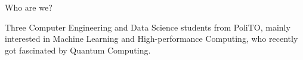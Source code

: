 \graphicspath{{assets/whoarewe/}} 

\begin{frame}{Who are we?}
	\begin{figure}[!h]
		\centering	
		  \quad
		  \quad
	\end{figure}

	Three Computer Engineering and Data Science students from \alert{PoliTO}, 
	mainly interested in Machine Learning and High-performance Computing, 
	who recently got fascinated by \alert{Quantum Computing}.
\end{frame}

